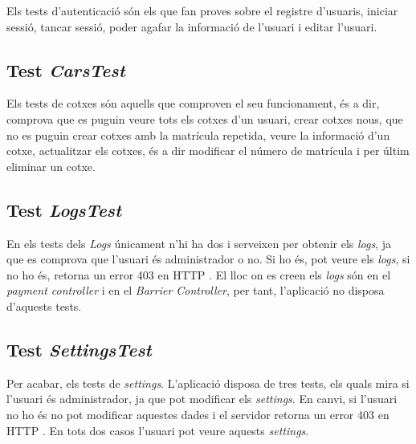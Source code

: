 Els tests d'autenticació són els que fan proves sobre el registre d'usuaris, iniciar sessió,
tancar sessió, poder agafar la informació de l'usuari i editar l'usuari.

\subsection{Test \emph{CarsTest}}

Els tests de cotxes són aquells que comproven el seu funcionament, és a dir, comprova que
es puguin veure tots els cotxes d'un usuari, crear cotxes nous, que no es puguin crear cotxes
amb la matrícula repetida, veure la informació d'un cotxe, actualitzar els cotxes, és a dir
modificar el número de matrícula i per últim eliminar un cotxe.

\subsection{Test \emph{LogsTest}}
En els tests dels \emph{Logs} únicament n'hi ha dos i serveixen per obtenir els \emph{logs}, ja que es
comprova que l'usuari és administrador o no. Si ho és, pot veure els \emph{logs}, si no ho és, retorna un error
403 en HTTP \autocite{http_403_response}. El lloc on es creen els \emph{logs} són en el
\emph{payment controller} i en el \emph{Barrier Controller}, per tant, l'aplicació no disposa d'aquests tests.

\subsection{Test \emph{SettingsTest}}

Per acabar, els tests de \emph{settings}. L'aplicació disposa de tres tests, els quals
mira si l'usuari és administrador, ja que pot modificar els \emph{settings}. En canvi,
si l'usuari no ho és no pot modificar aquestes dades i el servidor retorna un error 403 en HTTP \autocite{http_403_response}.
En tots dos casos l'usuari pot veure aquests \emph{settings}.
